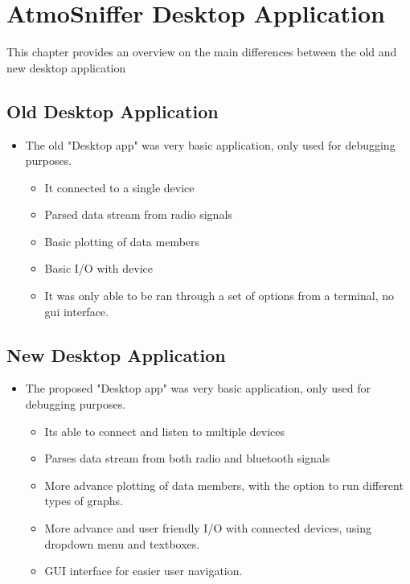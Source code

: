\chapter{AtmoSniffer Desktop Application} %
This chapter provides an overview on the main differences between the old and new desktop application

\section{Old Desktop Application}
\begin{itemize}
\item The old "Desktop app" was very basic application, only used for debugging purposes.
	\begin{itemize}
	\item It connected to a single device
	\item Parsed data stream from radio signals
	\item Basic plotting of data members
	\item Basic I/O with device
	\item It was only able to be ran through a set of options from a terminal, no gui interface.
	\end{itemize}
\end{itemize}

\section{New Desktop Application}
\begin{itemize}
\item The proposed "Desktop app" was very basic application, only used for debugging purposes.
	\begin{itemize}
	\item Its able to connect and listen to multiple devices
	\item Parses data stream from both radio and bluetooth signals
	\item More advance plotting of data members, with the option to run different types of graphs.
	\item More advance and user friendly I/O with connected devices, using dropdown menu and textboxes.
	\item GUI interface for easier user navigation.
	\end{itemize}
\end{itemize}